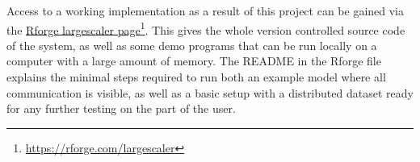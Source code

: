 Access to a working implementation as a result of this project can be gained via the \href{https://rforge.com/largescaler}{Rforge largescaler page}\footnote{\url{https://rforge.com/largescaler}}.
This gives the whole version controlled source code of the system, as well as some demo programs that can be run locally on a computer with a large amount of memory.
The \textsc{README} in the \lsr{} Rforge file explains the minimal steps required to run both an example model where all communication is visible, as well as a basic setup with a distributed dataset ready for any further testing on the part of the user.
